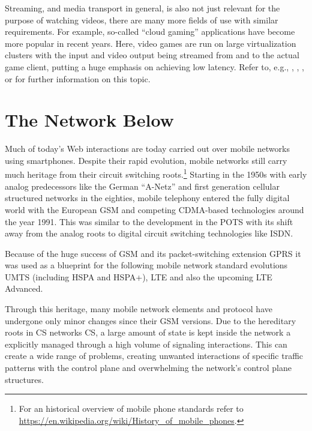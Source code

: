 Streaming, and media transport in general, is also not just relevant for the purpose of watching videos, there are many more fields of use with similar requirements. For example, so-called ``cloud gaming'' applications have become more popular in recent years. Here, video games are run on large virtualization clusters with the input and video output being streamed from and to the actual game client, putting a huge emphasis on achieving low latency. Refer to, e.g., \cite{4795441}, \cite{wang2009modeling}, \cite{jarschel2011cloudevaluation}, or \cite{ct2010wolken} for further information on this topic.


\section{The Network Below}

Much of today's Web interactions are today carried out over mobile networks using smartphones. Despite their rapid evolution, mobile networks still carry much heritage from their circuit switching roots.\footnote{For an historical overview of mobile phone standards refer to \url{https://en.wikipedia.org/wiki/History_of_mobile_phones}.}
Starting in the 1950s with early analog predecessors like the German ``A-Netz'' and first generation cellular structured networks in the eighties, mobile telephony entered the fully digital world with the European \gls{GSM} and competing \gls{CDMA}-based technologies around the year 1991. This was similar to the development in the \gls{POTS} with its shift away from the analog roots to digital circuit switching technologies like \gls{ISDN}.

Because of the huge success of \gls{GSM} and its packet-switching extension \gls{GPRS} it was used as a blueprint for the following mobile network standard evolutions \gls{UMTS} (including \gls{HSPA} and \gls{HSPA+}), \gls{LTE} and also the upcoming \gls{LTE} Advanced. 

Through this heritage, many mobile network elements and protocol have undergone only minor changes since their \gls{GSM} versions. Due to the hereditary roots in \gls{CS} networks \gls{CS}, a large amount of state is kept inside the network a explicitly managed through a high volume of signaling interactions. This can create a wide range of problems, creating unwanted interactions of specific traffic patterns with the control plane and overwhelming the network's control plane structures. 

